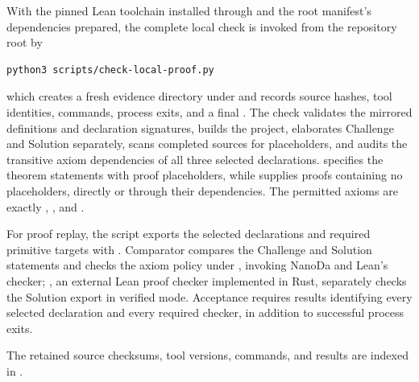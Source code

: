 \documentclass[mlmain]{jmlr}
\begin{document}
With the pinned Lean toolchain installed through  and the root
manifest's dependencies prepared, the complete local check is invoked from
the repository root by
\begin{lstlisting}
python3 scripts/check-local-proof.py
\end{lstlisting}
which creates a fresh evidence directory under 
and records source hashes, tool identities, commands, process exits, and a
final .  The check validates the mirrored definitions and
declaration signatures, builds the project, elaborates Challenge and Solution
separately, scans completed sources for placeholders, and audits the transitive
axiom dependencies of all three selected declarations.  
specifies the theorem statements with proof placeholders, while
 supplies proofs containing no placeholders, directly or
through their dependencies.  The permitted axioms are exactly
, , and .

For proof replay, the script exports the selected declarations and required
primitive targets with .  Comparator compares the Challenge
and Solution statements and checks the axiom policy under
, invoking NanoDa and Lean's checker; ,
an external Lean proof checker implemented in Rust, separately checks the
Solution export in verified mode.  Acceptance requires
results identifying every selected declaration and every required checker,
in addition to successful process exits.  

The retained source checksums, tool versions, commands, and results are indexed
in .  
\end{document}
